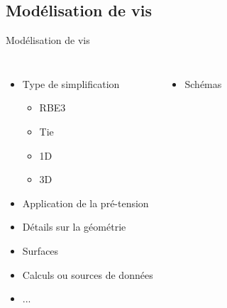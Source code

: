 \subsection{Modélisation de vis}
\label{sec:Modélisation de vis}

\begin{frame}[c]{Modélisation de vis}
  \begin{columns}
        \begin{itemize}
            \item Type de simplification
            \begin{itemize}
                \item RBE3
                \item Tie
                \item 1D
                \item 3D
            \end{itemize}
            \item Application de la pré-tension
            \item Détails sur la géométrie
            \item Surfaces
            \item Calculs ou sources de données
            \item ...
        \end{itemize}
    \begin{itemize}
        \item Schémas
    \end{itemize}
  \end{columns}
\end{frame}
